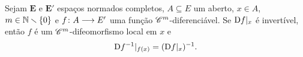 \begin{theorem}
\label{prop:teorema.funcao.inversa}
Sejam $\bm E$ e $\bm E'$ espaços normados completos, $A \subseteq E$ um aberto, $x \in A$, $m \in \mathbb{N} \smallsetminus \{0\}$ e $f\colon \allowbreak A \longrightarrow E'$ uma função $\mathscr{C}^m$-diferenciável. Se $\mathrm{D} f|_x$ é invertível, então $f$ é um $\mathscr{C}^m$-difeomorfismo local em $x$ e
	\begin{equation*}
	\mathrm{D} f^{-1}|_{f(x)} = (\mathrm{D} f|_x)^{-1}.
	\end{equation*}

\end{theorem}
